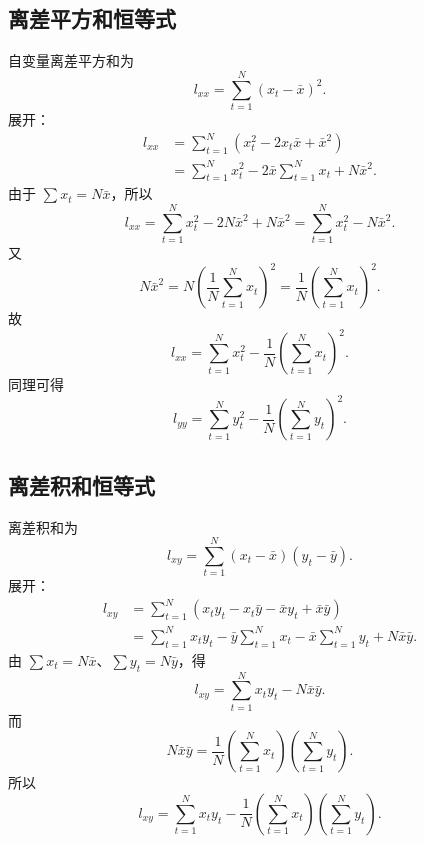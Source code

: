 \documentclass[UTF8,12pt,a4paper]{ctexart}
\begin{document}
\subsection{离差平方和恒等式}
自变量离差平方和为
\begin{equation*}
    l_{xx}=\sum_{t=1}^{N}(x_t-\bar{x})^2 .
\end{equation*}
展开：
\begin{equation*}
\begin{aligned}
    l_{xx}
    &=\sum_{t=1}^{N}(x_t^2-2x_t\bar{x}+\bar{x}^2) \\
    &=\sum_{t=1}^{N}x_t^2-2\bar{x}\sum_{t=1}^{N}x_t+N\bar{x}^2 .
\end{aligned}
\end{equation*}
由于 $\sum x_t=N\bar{x}$，所以
\begin{equation*}
    l_{xx}=\sum_{t=1}^{N}x_t^2-2N\bar{x}^2+N\bar{x}^2
    =\sum_{t=1}^{N}x_t^2-N\bar{x}^2 .
\end{equation*}
又
\begin{equation*}
    N\bar{x}^2=N\left(\frac{1}{N}\sum_{t=1}^{N}x_t\right)^2
    =\frac{1}{N}\left(\sum_{t=1}^{N}x_t\right)^2 .
\end{equation*}
故
\begin{equation*}
    l_{xx}=\sum_{t=1}^{N}x_t^2-\frac{1}{N}\left(\sum_{t=1}^{N}x_t\right)^2 .
\end{equation*}
同理可得
\begin{equation*}
    l_{yy}=\sum_{t=1}^{N}y_t^2-\frac{1}{N}\left(\sum_{t=1}^{N}y_t\right)^2 .
\end{equation*}

\subsection{离差积和恒等式}
离差积和为
\begin{equation*}
    l_{xy}=\sum_{t=1}^{N}(x_t-\bar{x})(y_t-\bar{y}) .
\end{equation*}
展开：
\begin{equation*}
\begin{aligned}
    l_{xy}
    &=\sum_{t=1}^{N}\left(x_ty_t-x_t\bar{y}-\bar{x}y_t+\bar{x}\bar{y}\right) \\
    &=\sum_{t=1}^{N}x_ty_t-\bar{y}\sum_{t=1}^{N}x_t-\bar{x}\sum_{t=1}^{N}y_t+N\bar{x}\bar{y} .
\end{aligned}
\end{equation*}
由 $\sum x_t=N\bar{x}$、$\sum y_t=N\bar{y}$，得
\begin{equation*}
    l_{xy}=\sum_{t=1}^{N}x_ty_t-N\bar{x}\bar{y} .
\end{equation*}
而
\begin{equation*}
    N\bar{x}\bar{y}=\frac{1}{N}\left(\sum_{t=1}^{N}x_t\right)
    \left(\sum_{t=1}^{N}y_t\right) .
\end{equation*}
所以
\begin{equation*}
    l_{xy}=\sum_{t=1}^{N}x_ty_t-\frac{1}{N}\left(\sum_{t=1}^{N}x_t\right)
    \left(\sum_{t=1}^{N}y_t\right) .
\end{equation*}
\end{document}
